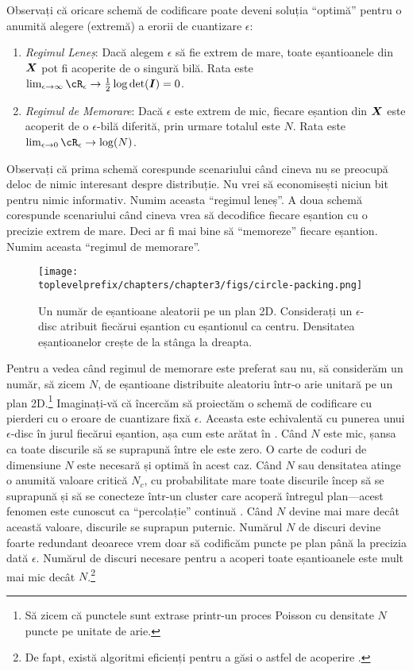 \documentclass[../../book-main_ro.tex]{subfiles}
\begin{document}
Observați că oricare schemă de codificare poate deveni soluția ``optimă'' pentru o anumită alegere (extremă) a erorii de cuantizare $\epsilon$:
\begin{enumerate}
	\item {\em Regimul Leneș}: Dacă alegem $\epsilon$ să fie extrem de mare, toate eșantioanele din $\bm{X}$ pot fi acoperite de o singură bilă. Rata este  $\lim_{\epsilon \rightarrow \infty} \cR_\epsilon \rightarrow \frac{1}{2}\log\det (\boldsymbol{I}) = 0$.
	\item {\em Regimul de Memorare}: Dacă $\epsilon$ este extrem de mic, fiecare eșantion din $\bm{X}$  este acoperit de o $\epsilon$-bilă diferită, prin urmare totalul este $N$. Rata este $\lim_{\epsilon \rightarrow 0} \cR_\epsilon \rightarrow \log(N)$.
\end{enumerate}
Observați că prima schemă corespunde scenariului când cineva nu se preocupă deloc de nimic interesant despre distribuție. Nu vrei să economisești niciun bit pentru nimic informativ. Numim aceasta ``regimul leneș''. A doua schemă corespunde scenariului când cineva vrea să decodifice fiecare eșantion cu o precizie extrem de mare. Deci ar fi mai bine să ``memoreze'' fiecare eșantion. Numim aceasta ``regimul de memorare''.
\begin{figure}
	\centering
	\texttt{[image: \\toplevelprefix/chapters/chapter3/figs/circle-packing.png]}
	\caption{Un număr de eșantioane aleatorii pe un plan 2D. Considerați un $\epsilon$-disc atribuit fiecărui eșantion cu eșantionul ca centru. Densitatea eșantioanelor crește de la stânga la dreapta.}
	\label{fig:circle-packing}
\end{figure}
\begin{example}
	Pentru a vedea când regimul de memorare este preferat sau nu, să considerăm un număr, să zicem $N$, de eșantioane distribuite aleatoriu într-o arie unitară pe un plan 2D.\footnote{Să zicem că punctele sunt extrase printr-un proces Poisson cu densitate $N$ puncte pe unitate de arie.} Imaginați-vă că încercăm să proiectăm o schemă de codificare cu pierderi cu o eroare de cuantizare fixă $\epsilon$. Aceasta este echivalentă cu punerea unui $\epsilon$-disc în jurul fiecărui eșantion, așa cum este arătat în . Când $N$ este mic, șansa ca toate discurile să se suprapună între ele este zero. O carte de coduri de dimensiune $N$ este necesară și optimă în acest caz. Când $N$ sau densitatea atinge o anumită valoare critică $N_c$, cu probabilitate mare toate discurile încep să se suprapună și să se conecteze într-un cluster care acoperă întregul plan---acest fenomen este cunoscut ca ``percolație'' continuă \cite{Gilbert-1961,Mertens-Moore-2012}. Când $N$ devine mai mare decât această valoare, discurile se suprapun puternic. Numărul $N$ de discuri devine foarte redundant deoarece vrem doar să codificăm puncte pe plan până la precizia dată $\epsilon$. Numărul de discuri necesare pentru a acoperi toate eșantioanele este mult mai mic decât $N$.\footnote{De fapt, există algoritmi eficienți pentru a găsi o astfel de acoperire \cite{Booth-2001}.}
\end{example}
\end{document}
